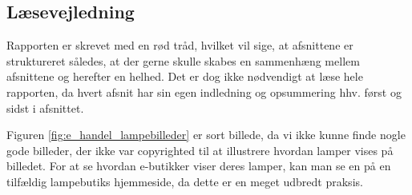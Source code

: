 \subsection{Læsevejledning}
Rapporten er skrevet med en rød tråd, hvilket vil sige, at afsnittene er struktureret således, at der gerne skulle skabes en sammenhæng mellem afsnittene og herefter en helhed. Det er dog ikke nødvendigt at læse hele rapporten, da hvert afsnit har sin egen indledning og opsummering hhv. først og sidst i afsnittet. 

Figuren \ref{fig:e_handel_lampebilleder} er sort billede, da vi ikke kunne finde nogle gode billeder, der ikke var copyrighted til at illustrere hvordan lamper vises på billedet. For at se hvordan e-butikker viser deres lamper, kan man se en på en tilfældig lampebutiks hjemmeside, da dette er en meget udbredt praksis. 




